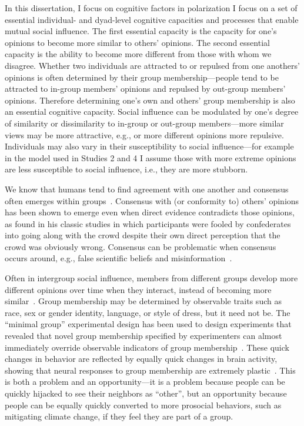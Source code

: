 \documentclass[12pt,letterpaper]{article}
\begin{document}
In this dissertation, I focus on cognitive factors in polarization I 
focus on a set of essential individual- and dyad-level cognitive 
capacities and processes that enable mutual social influence. 
The first essential capacity
is the capacity for one's opinions to become more similar to others' opinions.
The second essential capacity is the ability to become more different from those
with whom we disagree. Whether two individuals are attracted to or repulsed
from one anothers' opinions is often determined by their group membership---people
tend to be attracted to in-group members' opinions and repulsed by out-group
members' opinions. Therefore determining one's own and others' group membership is also an essential
cognitive capacity. Social influence can be modulated by one's degree of
similarity or dissimilarity to in-group or out-group members---more similar
views may be more attractive, e.g., or more different opinions more repulsive.
Individuals may also vary in their susceptibility to social influence---for
example in the model used in Studies 2 and 4 I assume those with more
extreme opinions are less susceptible to social influence, i.e., 
they are more stubborn.

We know that humans tend to find agreement with one another and consensus often 
emerges within groups~\cite{Festinger1954,Cartwright1956,French1956}. 
Consensus with (or conformity to) others' opinions has been shown to emerge 
even when direct evidence contradicts those opinions, as 
found in his classic studies in which participants were fooled by confederates
into going along with the crowd despite their own direct perception that
the crowd was obviously wrong. Consensus can be problematic when
consensus occurs around, e.g., 
false scientific beliefs and 
misinformation~\cite{Zollman2007,Zollman2013,OConnor2018,OConnor2019e}.

Often in intergroup social influence, members from different groups
develop more different opinions over time when they interact, instead of becoming more 
similar~\cite{Tajfel1979,Sherif1988,Flache2011,Bail2018}.
Group membership may be determined by observable traits such as race, 
sex or gender identity, language, or style of dress, but it need not be. 
The ``minimal group'' experimental design has 
been used to design experiments that revealed that novel group membership
specified by experimenters can almost immediately override observable
indicators of group membership~\cite{Tajfel1971,Billig1973,Tajfel1982}.
These quick changes in behavior are reflected by equally quick changes in 
brain activity, showing that neural responses to group membership are
extremely plastic~\cite{Cikara2014,Cikara2017}. This is both a problem and
an opportunity---it is a problem because people can be quickly hijacked to
see their neighbors as ``other'', but an opportunity because people can be
equally quickly converted to more prosocial behaviors, such as mitigating
climate change, if they feel they are part of a group.
\end{document}
